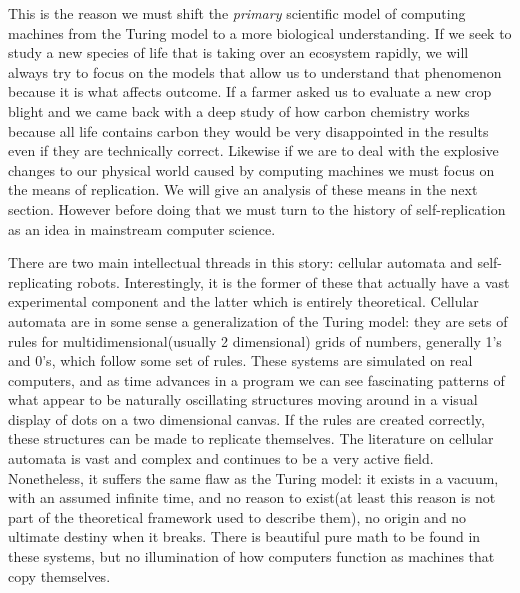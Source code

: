 This is the reason we must shift the \emph{primary} scientific model of
computing machines from the Turing model to a more biological
understanding. If we seek to study a new species of life that is taking
over an ecosystem rapidly, we will always try to focus on the models
that allow us to understand that phenomenon because it is what affects
outcome. If a farmer asked us to evaluate a new crop blight and we came
back with a deep study of how carbon chemistry works because all life
contains carbon they would be very disappointed in the results even if
they are technically correct. Likewise if we are to deal with the
explosive changes to our physical world caused by computing machines we
must focus on the means of replication. We will give an analysis of
these means in the next section. However before doing that we must turn
to the history of self-replication as an idea in mainstream computer
science.

There are two main intellectual threads in this story: cellular automata
and self-replicating robots. Interestingly, it is the former of these
that actually have a vast experimental component and the latter which is
entirely theoretical. Cellular automata are in some sense a
generalization of the Turing model: they are sets of rules for
multidimensional(usually 2 dimensional) grids of numbers, generally 1's
and 0's, which follow some set of rules. These systems are simulated on
real computers, and as time advances in a program we can see fascinating
patterns of what appear to be naturally oscillating structures moving
around in a visual display of dots on a two dimensional canvas. If the
rules are created correctly, these structures can be made to replicate
themselves. The literature on cellular automata is vast and complex and
continues to be a very active field. Nonetheless, it suffers the same
flaw as the Turing model: it exists in a vacuum, with an assumed
infinite time, and no reason to exist(at least this reason is not part
of the theoretical framework used to describe them), no origin and no
ultimate destiny when it breaks. There is beautiful pure math to be
found in these systems, but no illumination of how computers function as
machines that copy themselves.

